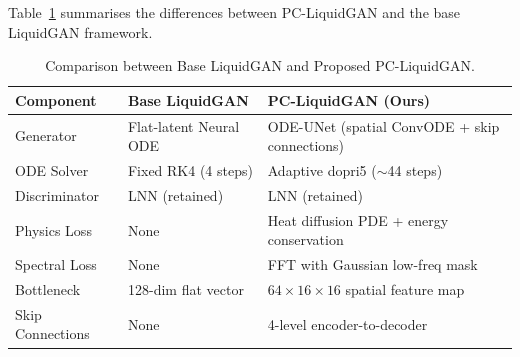 Table~\ref{tab:diff} summarises the differences between PC-LiquidGAN and the base LiquidGAN framework.

\begin{table}[htbp]
\centering
\caption{Comparison between Base LiquidGAN and Proposed PC-LiquidGAN.}
\label{tab:diff}
\begin{tabular}{lll}
\toprule
\textbf{Component} & \textbf{Base LiquidGAN} & \textbf{PC-LiquidGAN (Ours)} \\
\midrule
Generator & Flat-latent Neural ODE & ODE-UNet (spatial ConvODE + skip connections) \\
ODE Solver & Fixed RK4 (4 steps) & Adaptive dopri5 ($\sim$44 steps) \\
Discriminator & LNN (retained) & LNN (retained) \\
Physics Loss & None & Heat diffusion PDE + energy conservation \\
Spectral Loss & None & FFT with Gaussian low-freq mask \\
Bottleneck & 128-dim flat vector & $64 \times 16 \times 16$ spatial feature map \\
Skip Connections & None & 4-level encoder-to-decoder \\
\bottomrule
\end{tabular}
\end{table}